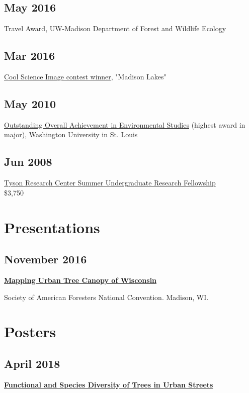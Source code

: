 \documentclass{article}
\begin{document}
\subsection*{May 2016}
\label{sec:orgf47af77}
Travel Award, UW-Madison Department of Forest and Wildlife Ecology\\

\subsection*{Mar 2016}
\label{sec:org02dc4f9}
\href{http://news.wisc.edu/cool-science-images-2016/\#\&gid=1\&pid=10}{Cool Science Image contest winner}, "Madison Lakes" \\

\subsection*{May  2010}
\label{sec:orgc9acaad}
\href{http://enst.wustl.edu/program/awards}{Outstanding Overall Achievement in Environmental Studies} (highest
award in major), Washington University in St. Louis

\subsection*{Jun 2008}
\label{sec:orga26bfd7}
\href{https://tyson.wustl.edu/2008}{Tyson Research Center Summer Undergraduate Research Fellowship} \\
 \$3,750

\section*{Presentations}
\label{sec:org36b0cc6}
\subsection*{November 2016}
\label{sec:org0c2453c}
\textbf{\href{http://pages.stat.wisc.edu/\~erker/Presentations/SAF\_20161105/saf\_presentation.html}{Mapping Urban Tree Canopy of Wisconsin}}

Society of American Foresters National Convention. Madison, WI.
\section*{Posters}
\label{sec:org8d4faab}
\subsection*{April 2018}
\label{sec:org61dbff0}
\textbf{\href{http://pages.stat.wisc.edu/\~erker/Posters/NASA\_poster\_2018.jpg}{Functional and Species Diversity of Trees in Urban Streets}}
\end{document}
